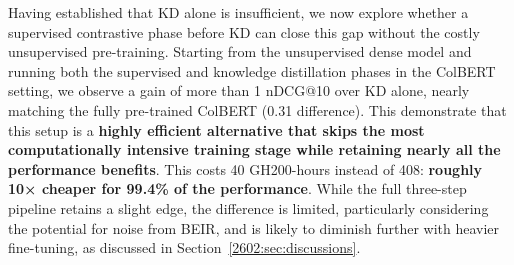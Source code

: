Having established that KD alone is insufficient, we now explore whether a supervised contrastive phase before KD can close this gap without the costly unsupervised pre-training. Starting from the unsupervised dense model and running both the supervised and knowledge distillation phases in the ColBERT setting, we observe a gain of more than 1 nDCG@10 over KD alone, nearly matching the fully pre-trained ColBERT (0.31 difference).  This demonstrate that this setup is a \textbf{highly efficient alternative that skips the most computationally intensive training stage while retaining nearly all the performance benefits}. This costs 40 GH200-hours instead of 408: \textbf{roughly 10× cheaper for 99.4\% of the performance}. While the full three-step pipeline retains a slight edge, the difference is limited, particularly considering the potential for noise from BEIR, and is likely to diminish further with heavier fine-tuning, as discussed in Section~\ref{2602:sec:discussions}.




